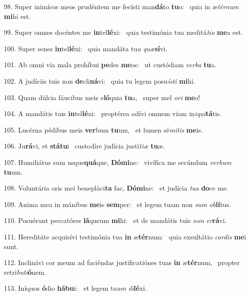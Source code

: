 98. Super inimícos meos prudéntem me fecísti man\textbf{dá}to \textbf{tu}o: \ast\  quia in æ\textit{tér}\textit{num} \textbf{mi}hi est.\

99. Super omnes docéntes me \textbf{in}tel\textbf{lé}xi: \ast\  quia testimónia tua meditá\textit{ti}\textit{o} \textbf{me}a est.\

100. Super senes \textbf{in}tel\textbf{lé}xi: \ast\  quia mandáta tu\textit{a} \textit{quæ}\textbf{sí}vi.\

101. Ab omni via mala prohíbui \textbf{pe}des \textbf{me}os: \ast\  ut custódiam \textit{ver}\textit{ba} \textbf{tu}a.\

102. A judíciis tuis non \textbf{de}cli\textbf{ná}vi: \ast\  quia tu legem posu\textit{ís}\textit{ti} \textbf{mi}hi.\

103. Quam dúlcia fáucibus meis e\textbf{ló}quia \textbf{tu}a, \ast\  super mel \textit{o}\textit{ri} \textbf{me}o!\

104. A mandátis tuis \textbf{in}tel\textbf{lé}xi: \ast\  proptérea odívi omnem viam in\textit{i}\textit{qui}\textbf{tá}tis.\

105. Lucérna pédibus meis \textbf{ver}bum \textbf{tu}um, \ast\  et lumen sé\textit{mi}\textit{tis} \textbf{me}is.\

106. Ju\textbf{rá}vi, et \textbf{stá}\textbf{tu}i \ast\  custodíre judícia justí\textit{ti}\textit{æ} \textbf{tu}æ.\

107. Humiliátus sum usque\textbf{quá}que, \textbf{Dó}\textbf{mi}ne: \ast\  vivífica me secúndum \textit{ver}\textit{bum} \textbf{tu}um.\

108. Voluntária oris mei benepláci\textbf{ta} fac, \textbf{Dó}\textbf{mi}ne: \ast\  et judícia \textit{tu}\textit{a} \textbf{do}ce me.\

109. Anima mea in mánibus \textbf{me}is \textbf{sem}per: \ast\  et legem tuam non \textit{sum} \textit{ob}\textbf{lí}tus.\

110. Posuérunt peccatóres \textbf{lá}queum \textbf{mi}hi: \ast\  et de mandátis tuis \textit{non} \textit{er}\textbf{rá}vi.\

111. Hereditáte acquisívi testimónia tua \textbf{in} æ\textbf{tér}num: \ast\  quia exsultátio \textit{cor}\textit{dis} \textbf{me}i sunt.\

112. Inclinávi cor meum ad faciéndas justificatiónes tuas \textbf{in} æ\textbf{tér}num, \ast\  propter retri\textit{bu}\textit{ti}\textbf{ó}nem.\

113. Iníquos \textbf{ó}dio \textbf{há}\textbf{bu}i: \ast\  et legem tu\textit{am} \textit{di}\textbf{lé}xi.\

